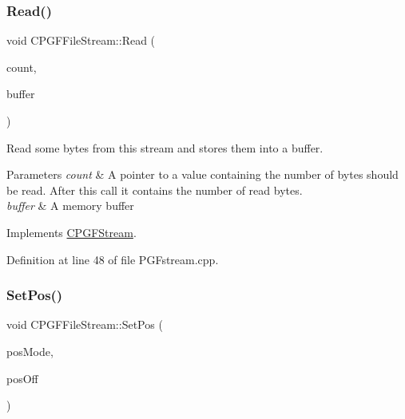 \subsubsection{\texorpdfstring{Read()}{Read()}}
{\footnotesize\ttfamily void C\+P\+G\+F\+File\+Stream\+::\+Read (\begin{DoxyParamCaption}\item[{int $\ast$}]{count,  }\item[{void $\ast$}]{buffer }\end{DoxyParamCaption})\hspace{0.3cm}{\ttfamily [virtual]}}

Read some bytes from this stream and stores them into a buffer. 
\begin{DoxyParams}{Parameters}
{\em count} & A pointer to a value containing the number of bytes should be read. After this call it contains the number of read bytes. \\
\hline
{\em buffer} & A memory buffer \\
\hline
\end{DoxyParams}


Implements \mbox{\hyperlink{classCPGFStream_afdc81fe9b4d2d962b8112e50eace95a2}{C\+P\+G\+F\+Stream}}.



Definition at line 48 of file P\+G\+Fstream.\+cpp.


\begin{DoxyCode}{0}

\end{DoxyCode}
\mbox{\label{classCPGFFileStream_a2460f1fdab77a44ddf24420139a50043}} 
\subsubsection{\texorpdfstring{SetPos()}{SetPos()}}
{\footnotesize\ttfamily void C\+P\+G\+F\+File\+Stream\+::\+Set\+Pos (\begin{DoxyParamCaption}\item[{short}]{pos\+Mode,  }\item[{I\+N\+T64}]{pos\+Off }\end{DoxyParamCaption})\hspace{0.3cm}{\ttfamily [virtual]}}

